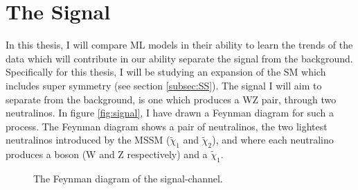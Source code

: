 \section{The Signal}\label{sec:signal}
In this thesis, I will compare \ac{ML} models in their ability to learn the trends of the data which will contribute  
in our ability separate the signal from the background. Specifically for this thesis, I will be studying an expansion of the 
\ac{SM} which includes super symmetry (see section \ref{subsec:SS}). The signal I will aim to separate from the background, is one 
which produces a WZ pair, through two neutralinos. In figure \ref{fig:signal}, I have drawn a Feynman diagram for such a process.
The Feynman diagram shows a pair of neutralinos, the two lightest neutralinos introduced by the \ac{MSSM} ($\tilde{\chi}_1$ and $\tilde{\chi}_2$), 
and where each neutralino produces a boson (W and Z respectively) and a $\tilde{\chi}_1$.
\begin{figure}
    \centering
    \caption{The Feynman diagram of the signal-channel.}
\end{figure}